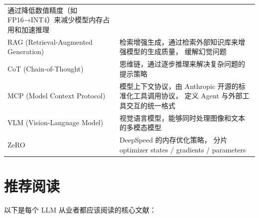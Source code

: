 \begin{table}[H]
\begin{tabularx}{\linewidth}{l >{\raggedright\arraybackslash}X}
  通过降低数值精度（如 FP16→INT4）来减少模型内存占用和加速推理 \\
RAG (Retrieval-Augmented Generation) &
  检索增强生成，通过检索外部知识库来增强模型的生成质量，
  缓解幻觉问题 \\
CoT (Chain-of-Thought) &
  思维链，通过逐步推理来解决复杂问题的提示策略 \\
MCP (Model Context Protocol) &
  模型上下文协议，由 Anthropic 开源的标准化工具调用协议，
  定义 Agent 与外部工具交互的统一格式 \\
VLM (Vision-Language Model) &
  视觉语言模型，能够同时处理图像和文本的多模态模型 \\
ZeRO &
  DeepSpeed 的内存优化策略，
  分片 optimizer states / gradients / parameters~\cite{rajbhandari2020zero} \\
\bottomrule
\end{tabularx}
\end{table}

\section{推荐阅读}

以下是每个 LLM 从业者都应该阅读的核心文献：

